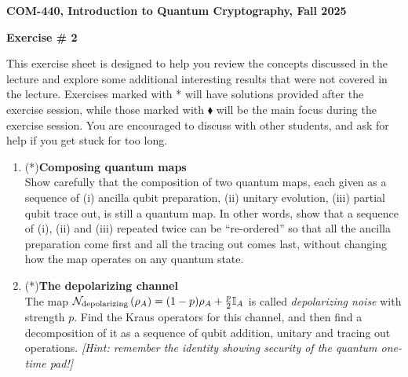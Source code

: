 \documentclass[12pt]{article}
\newcommand{\header}[1]{\begin{center} {\large\bf #1} \end{center}}
\begin{document}
\header{COM-440, Introduction to Quantum Cryptography, Fall 2025}
\header{\bf Exercise \# 2}

This exercise sheet is designed to help you review the concepts discussed in the lecture and explore some additional interesting results that were not covered in the lecture. Exercises marked with * will have solutions provided after the exercise session, while those marked with $\blacklozenge$ will be the main focus during the exercise session. You are encouraged to discuss with other students, and ask for help if you get stuck for too long.

\begin{enumerate}

\item {(*)\;\bf Composing quantum maps}\\
 Show carefully that the composition of two quantum maps, each given as a sequence of (i) ancilla qubit preparation, (ii) unitary evolution, (iii) partial qubit trace out, is still a quantum map. In other words, show that a sequence of (i), (ii) and (iii) repeated twice can be ``re-ordered'' so that all the ancilla preparation come first and all the tracing out comes last, without changing how the map operates on any quantum state. 

\item {(*)\;\bf The depolarizing channel}\\
The map $\mathcal{N}_{\rm depolarizing}\left(\rho_A\right) = (1-p) \rho_A + \frac{p}{2}\mathbb{I}_A$ is called \emph{depolarizing noise} with strength $p$. Find the Kraus operators for this channel, and then  find a decomposition of it as a sequence of qubit addition, unitary and tracing out operations. \emph{[Hint: remember the identity showing security of the quantum one-time pad!]}



\end{enumerate}
\end{document}
